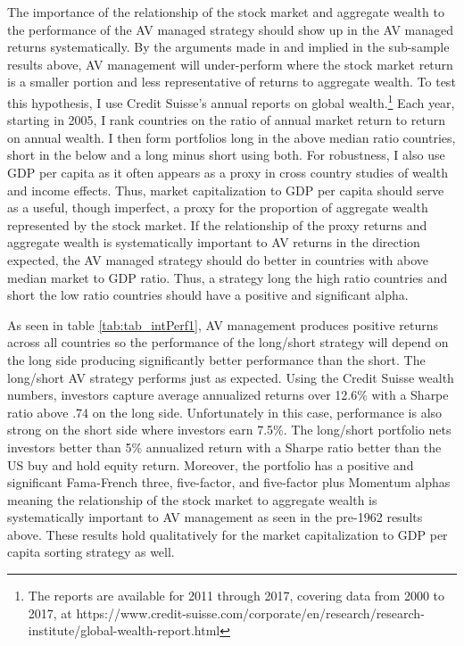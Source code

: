 The importance of the relationship of the stock market and aggregate wealth to the performance of the AV managed strategy should show up in the AV managed returns systematically. By the arguments made in \citet{pollet_average_2010} and implied in the sub-sample results above, AV management will under-perform where the stock market return is a smaller portion and less representative of returns to aggregate wealth. To test this hypothesis, I use Credit Suisse's annual reports on global wealth.\footnote{The reports are available for 2011 through 2017, covering data from 2000 to 2017, at https://www.credit-suisse.com/corporate/en/research/research-institute/global-wealth-report.html} Each year, starting in 2005, I rank countries on the ratio of annual market return to return on annual wealth. I then form portfolios long in the above median ratio countries, short in the below and a long minus short using both. For robustness, I also use GDP per capita as it often appears as a proxy in cross country studies of wealth and income effects. \citep{barro_cross-country_1989,levine_what_1993,baird_aggregate_2010} Thus, market capitalization to GDP per capita should serve as a useful, though imperfect, a proxy for
the proportion of aggregate wealth represented by the stock market. If the relationship of the proxy returns and aggregate wealth is systematically important to AV returns in the direction expected, the AV managed strategy should do better in countries with above median market to GDP ratio. Thus, a strategy long the high ratio countries and short the low ratio countries should have a positive and significant alpha. 

As seen in table \ref{tab:tab_intPerf1}, AV management produces positive returns across all countries so the performance of the long/short strategy will depend on the long side producing significantly better performance than the short. The long/short AV strategy performs just as expected. Using the Credit Suisse wealth numbers, investors capture average annualized
returns over 12.6\% with a Sharpe ratio above .74 on the long side. Unfortunately in this case, performance is also strong on the short side where investors earn 7.5\%. The long/short portfolio nets investors better than 5\% annualized return with a Sharpe ratio better than the US buy and hold equity return. Moreover,
the portfolio has a positive and significant Fama-French three, five-factor, and five-factor plus Momentum
alphas meaning the relationship of the stock market to aggregate wealth is systematically important
 to AV management as seen in the pre-1962 results above. These results hold qualitatively for the market capitalization to GDP per capita sorting strategy as well.

